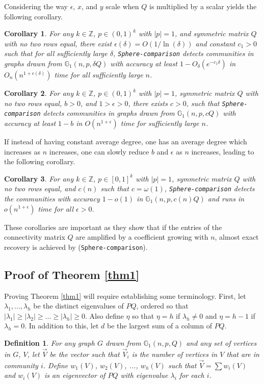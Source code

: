 \documentclass[11pt]{article}
\newcommand{\gss}{\mathbb{G}_1}
\newcommand{\1}{\mathbb{1}}
\newtheorem{corollary}{Corollary}
\newtheorem{definition}{Definition}
\begin{document}
Considering the way $\epsilon$, $x$, and $y$ scale when $Q$ is multiplied by a scalar yields the following corollary.

\begin{corollary}\label{partial-delta}
For any $k\in \mathbb{Z}$, $p\in (0,1)^k$ with $|p|=1$, and symmetric  matrix $Q$ with no two rows equal, there exist $\epsilon(\delta)=O(1/\ln(\delta))$ and constant $c_1>0$ such that for all sufficiently large $\delta$, {\tt Sphere-comparison} detects communities in graphs drawn from $\gss(n,p,\delta Q)$ with accuracy at least $1-O_\delta(e^{-c_1\delta})$ in $O_n(n^{1+\epsilon(\delta)})$ time for all sufficiently large $n$.
\end{corollary}

\begin{corollary}
For any $k\in \mathbb{Z}$, $p\in (0,1)^k$ with $|p|=1$, symmetric  matrix $Q$ with no two rows equal, $b>0$, and $1>\epsilon>0$, there exists $c>0$, such that {\tt Sphere-comparison} detects communities in graphs drawn from $\gss(n,p,cQ)$ with accuracy at least $1-b$ in $O(n^{1+\epsilon})$ time for sufficiently large $n$.
\end{corollary}

If instead of having constant average degree, one has an average degree which increases as $n$ increases, one can slowly reduce $b$ and $\epsilon$ as $n$ increases, leading to the following corollary.

\begin{corollary}
For any $k\in \mathbb{Z}$, $p\in [0,1]^k$ with $|p|=1$, symmetric  matrix $Q$ with no two rows equal, and $c(n)$ such that $c=\omega(1)$, {\tt Sphere-comparison} detects the communities with accuracy $1-o(1)$ in $\gss(n,p,c(n)Q)$ and runs in $o(n^{1+\epsilon})$ time for all $\epsilon>0$.
\end{corollary}

These corollaries are important as they show that if the entries of the connectivity matrix $Q$ are amplified by a coefficient growing with $n$, almost exact recovery is achieved by ({\tt Sphere-comparison}). 

\subsection{Proof of Theorem \ref{thm1}}
Proving Theorem \ref{thm1} will require establishing some terminology. First, let $\lambda_1,...,\lambda_h$ be the distinct eigenvalues of $PQ$, ordered so that $|\lambda_1|\ge|\lambda_2|\ge...\ge|\lambda_h|\ge 0$. Also define $\eta$ so that $\eta=h$ if $\lambda_h\ne 0$ and $\eta=h-1$ if $\lambda_h=0$. In addition to this, let $d$ be the largest sum of a column of $PQ$.
\begin{definition}
For any graph $G$ drawn from $\gss(n,p,Q)$ and any set of vertices in $G$, $V$, let $\overrightarrow{V}$ be the vector such that $\overrightarrow{V}_i$ is the number of vertices in $V$ that are in community $i$. Define $w_1(V)$, $w_2(V)$, ..., $w_h(V)$ such that $\overrightarrow{V}=\sum w_i(V)$ and $w_i(V)$ is an eigenvector of $PQ$ with eigenvalue $\lambda_i$ for each $i$.
\end{definition}
\end{document}
